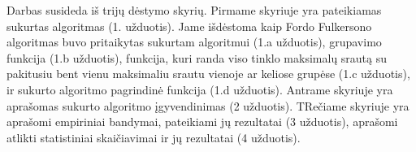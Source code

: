Darbas susideda iš trijų dėstymo skyrių. Pirmame skyriuje yra pateikiamas sukurtas algoritmas (1. užduotis). Jame išdėstoma kaip Fordo Fulkersono algoritmas buvo pritaikytas sukurtam algoritmui (1.a užduotis), grupavimo funkcija (1.b užduotis), funkcija, kuri randa viso tinklo maksimalų srautą su pakitusiu bent vienu maksimaliu srautu vienoje ar keliose grupėse (1.c užduotis), ir sukurto algoritmo pagrindinė funkcija (1.d užduotis). Antrame skyriuje yra aprašomas sukurto algoritmo įgyvendinimas (2 užduotis). TRečiame skyriuje yra aprašomi empiriniai bandymai, pateikiami jų rezultatai (3 užduotis), aprašomi atlikti statistiniai skaičiavimai ir jų rezultatai (4 užduotis).